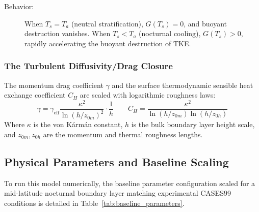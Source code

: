 \documentclass{article}
\begin{document}
\begin{description}
    \item[Behavior:] When $T_s = T_a$ (neutral stratification), $G(T_s) = 0$, and buoyant destruction vanishes. When $T_s < T_a$ (nocturnal cooling), $G(T_s) > 0$, rapidly accelerating the buoyant destruction of TKE.
\end{description}

\subsubsection{The Turbulent Diffusivity/Drag Closure}
The momentum drag coefficient $\gamma$ and the surface thermodynamic sensible heat exchange coefficient $C_H$ are scaled with logarithmic roughness laws:
\begin{equation}
\gamma = \gamma_{\mathrm{eff}}\frac{\kappa^2}{\ln(h/z_{0m})^2} \cdot \frac{1}{h} \qquad C_H = \frac{\kappa^2}{\ln(h/z_{0m})\ln(h/z_{0h})}
\label{eq:drag_closures}
\end{equation}
Where $\kappa$ is the von K\'arm\'an constant, $h$ is the bulk boundary layer height scale, and $z_{0m}, z_{0h}$ are the momentum and thermal roughness lengths.

\subsection{Physical Parameters and Baseline Scaling}
\label{subsec:parameters}

To run this model numerically, the baseline parameter configuration scaled for a mid-latitude nocturnal boundary layer matching experimental CASES99 conditions is detailed in Table~\ref{tab:baseline_parameters}.
\end{document}
